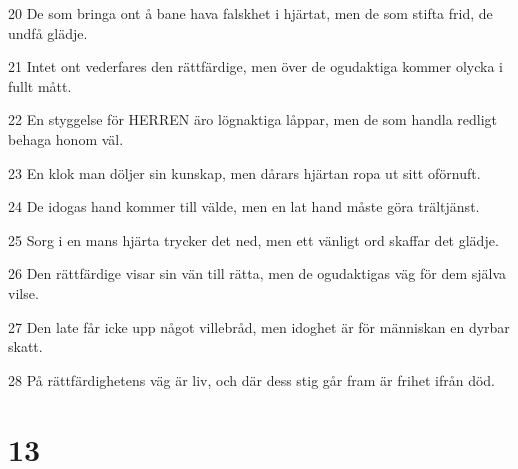\par 20 De som bringa ont å bane hava falskhet i hjärtat, men de som stifta frid, de undfå glädje.
\par 21 Intet ont vederfares den rättfärdige, men över de ogudaktiga kommer olycka i fullt mått.
\par 22 En styggelse för HERREN äro lögnaktiga låppar, men de som handla redligt behaga honom väl.
\par 23 En klok man döljer sin kunskap, men dårars hjärtan ropa ut sitt oförnuft.
\par 24 De idogas hand kommer till välde, men en lat hand måste göra trältjänst.
\par 25 Sorg i en mans hjärta trycker det ned, men ett vänligt ord skaffar det glädje.
\par 26 Den rättfärdige visar sin vän till rätta, men de ogudaktigas väg för dem själva vilse.
\par 27 Den late får icke upp något villebråd, men idoghet är för människan en dyrbar skatt.
\par 28 På rättfärdighetens väg är liv, och där dess stig går fram är frihet ifrån död.

\chapter{13}

